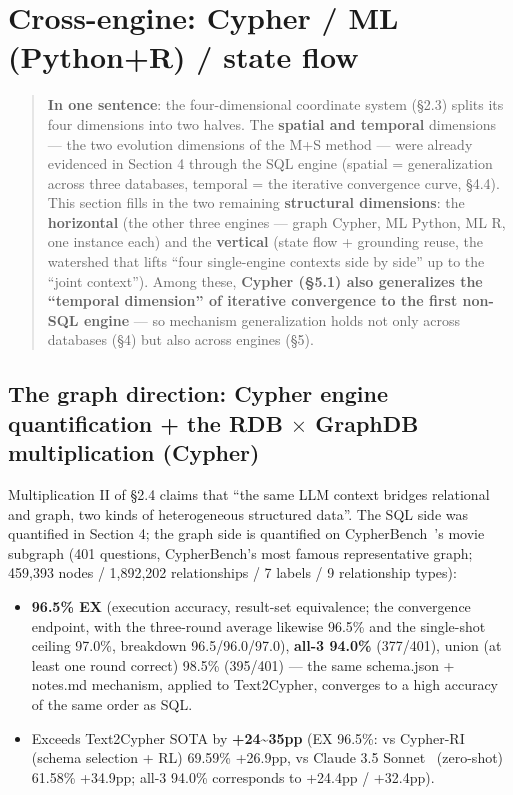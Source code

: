 \documentclass[11pt]{article}
\begin{document}
\section{Cross-engine: Cypher / ML (Python+R) / state flow}

\begin{quote}
\textbf{In one sentence}: the four-dimensional coordinate system (\S{}2.3) splits its four dimensions into two halves. The \textbf{spatial and temporal} dimensions --- the two evolution dimensions of the M+S method --- were already evidenced in Section 4 through the SQL engine (spatial = generalization across three databases, temporal = the iterative convergence curve, \S{}4.4). This section fills in the two remaining \textbf{structural dimensions}: the \textbf{horizontal} (the other three engines --- graph Cypher, ML Python, ML R, one instance each) and the \textbf{vertical} (state flow + grounding reuse, the watershed that lifts ``four single-engine contexts side by side'' up to the ``joint context''). Among these, \textbf{Cypher (\S{}5.1) also generalizes the ``temporal dimension'' of iterative convergence to the first non-SQL engine} --- so mechanism generalization holds not only across databases (\S{}4) but also across engines (\S{}5).
\end{quote}

\subsection{The graph direction: Cypher engine quantification + the RDB $\times$ GraphDB multiplication (Cypher)}

Multiplication II of \S{}2.4 claims that ``the same LLM context bridges relational and graph, two kinds of heterogeneous structured data''. The SQL side was quantified in Section 4; the graph side is quantified on CypherBench~\cite{cypherbench}'s movie subgraph (401 questions, CypherBench's most famous representative graph; 459,393 nodes / 1,892,202 relationships / 7 labels / 9 relationship types):

\begin{itemize}
\item
  \textbf{96.5\% EX} (execution accuracy, result-set equivalence; the convergence endpoint, with the three-round average likewise 96.5\% and the single-shot ceiling 97.0\%, breakdown 96.5/96.0/97.0), \textbf{all-3 94.0\%} (377/401), union (at least one round correct) 98.5\% (395/401) --- the same schema.json + notes.md mechanism, applied to Text2Cypher, converges to a high accuracy of the same order as SQL.
\item
  Exceeds Text2Cypher SOTA by \textbf{+24\textasciitilde35pp} (EX 96.5\%: vs Cypher-RI~\cite{cypher-ri} (schema selection + RL) 69.59\% +26.9pp, vs Claude 3.5 Sonnet~\cite{claude-35-sonnet} (zero-shot) 61.58\% +34.9pp; all-3 94.0\% corresponds to +24.4pp / +32.4pp).
\end{itemize}
\end{document}
